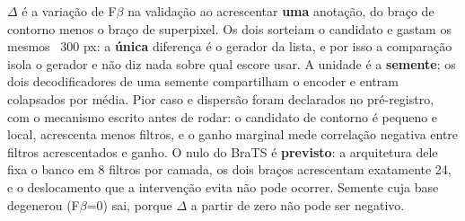 \footnotesize $\Delta$ é a variação de F$\beta$ na validação ao acrescentar \textbf{uma} anotação, do braço de contorno menos o braço de superpixel. Os dois sorteiam o candidato e gastam os mesmos ~300 px: a \textbf{única} diferença é o gerador da lista, e por isso a comparação isola o gerador e não diz nada sobre qual escore usar. A unidade é a \textbf{semente}; os dois decodificadores de uma semente compartilham o encoder e entram colapsados por média. Pior caso e dispersão foram declarados no pré-registro, com o mecanismo escrito antes de rodar: o candidato de contorno é pequeno e local, acrescenta menos filtros, e o ganho marginal mede correlação negativa entre filtros acrescentados e ganho. O nulo do BraTS é \textbf{previsto}: a arquitetura dele fixa o banco em 8 filtros por camada, os dois braços acrescentam exatamente 24, e o deslocamento que a intervenção evita não pode ocorrer. Semente cuja base degenerou (F$\beta$=0) sai, porque $\Delta$ a partir de zero não pode ser negativo.
\normalsize
